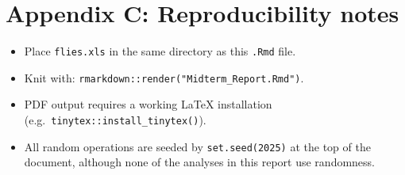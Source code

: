 \documentclass[
  11pt,
]{article}
\newcounter{none} %
\providecommand{\tightlist}{%
  \setlength{\itemsep}{0pt}\setlength{\parskip}{0pt}}
\begin{document}
\section{Appendix C: Reproducibility
notes}\label{appendix-c-reproducibility-notes}

\begin{itemize}
\tightlist
\item
  Place \texttt{flies.xls} in the same directory as this \texttt{.Rmd}
  file.
\item
  Knit with: \texttt{rmarkdown::render("Midterm\_Report.Rmd")}.
\item
  PDF output requires a working LaTeX installation
  (e.g.~\texttt{tinytex::install\_tinytex()}).
\item
  All random operations are seeded by \texttt{set.seed(2025)} at the top
  of the document, although none of the analyses in this report use
  randomness.
\end{itemize}
\end{document}
